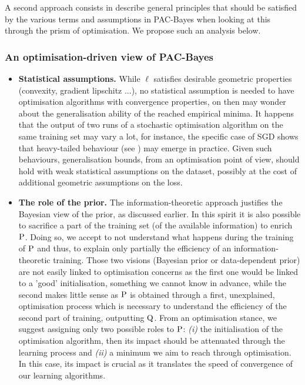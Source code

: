 A second approach consists in describe general principles that should be satisfied by the various terms and assumptions in PAC-Bayes when looking at this through the prism of optimisation. We propose such an analysis below.

\subsubsection*{An optimisation-driven view of PAC-Bayes}

\begin{itemize}
  \item \textbf{Statistical assumptions.} While $\ell$ satisfies desirable geometric properties (convexity, gradient lipschitz ...), no statistical assumption is needed to have optimisation algorithms with convergence properties, on then may wonder about the generalisation ability of the reached empirical minima. It happens that the output of two runs of a stochastic optimisation algorithm on the same training set may vary a lot, for instance, the specific case of SGD shows that  heavy-tailed behaviour (see \eg \citealp{simsekli2019tail,zhang2020adaptive,gurbuzbalaban2020heavy}) may emerge in practice. Given such behaviours, generalisation bounds, from an optimisation point of view, should hold with weak statistical assumptions on the dataset, possibly at the cost of additional geometric assumptions on the loss.
  \item \textbf{The role of the prior.} The information-theoretic approach justifies the Bayesian view of the prior, as discussed earlier. In this spirit it is also possible to sacrifice a part of the training set (\ie of the available information) to enrich $\P$. Doing so, we accept to not understand what happens during the training of $\P$ and thus, to explain only partially the efficiency of an information-theoretic training. Those two visions (Bayesian prior or data-dependent prior) are not easily linked to optimisation concerns as the first one would be linked to a 'good' initialisation, something we cannot know in advance, while the second makes little sense as $\P$ is obtained through a first, unexplained, optimisation process which is necessary to understand the efficiency of the second part of training, outputting $\Q$. From an optimisation stance, we suggest assigning only two possible roles to $\P$: \textit{(i)} the initialisation of the optimisation algorithm, then its impact should be attenuated through the learning process and \textit{(ii)} a minimum we aim to reach through optimisation. In this case, its impact is crucial as it translates the speed of convergence of our learning algorithms.

\end{itemize}
